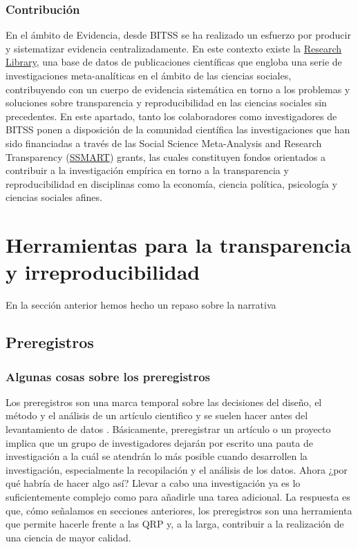 \documentclass[
]{book}
\begin{document}
\hypertarget{contribuciuxf3n}{%
\subsection{Contribución}\label{contribuciuxf3n}}

En el ámbito de Evidencia, desde BITSS se ha realizado un esfuerzo por producir y sistematizar evidencia centralizadamente. En este contexto existe la \href{https://www.bitss.org/research-library/}{Research Library}, una base de datos de publicaciones científicas que engloba una serie de investigaciones meta-analíticas en el ámbito de las ciencias sociales, contribuyendo con un cuerpo de evidencia sistemática en torno a los problemas y soluciones sobre transparencia y reproducibilidad en las ciencias sociales sin precedentes. En este apartado, tanto los colaboradores como investigadores de BITSS ponen a disposición de la comunidad científica las investigaciones que han sido financiadas a través de las Social Science Meta-Analysis and Research Transparency (\href{https://www.bitss.org/ssmart-grants/}{SSMART}) grants, las cuales constituyen fondos orientados a contribuir a la investigación empírica en torno a la transparencia y reproducibilidad en disciplinas como la economía, ciencia política, psicología y ciencias sociales afines.

\hypertarget{herramientas-para-la-transparencia-y-irreproducibilidad}{%
\chapter{Herramientas para la transparencia y irreproducibilidad}\label{herramientas-para-la-transparencia-y-irreproducibilidad}}

En la sección anterior hemos hecho un repaso sobre la narrativa

\hypertarget{preregistros}{%
\section{Preregistros}\label{preregistros}}

\hypertarget{algunas-cosas-sobre-los-preregistros}{%
\subsection{Algunas cosas sobre los preregistros}\label{algunas-cosas-sobre-los-preregistros}}

Los preregistros son una marca temporal sobre las decisiones del diseño, el método y el análisis de un artículo cientifico y se suelen hacer antes del levantamiento de datos \citep{stewart_Preregistration_2020}. Básicamente, preregistrar un artículo o un proyecto implica que un grupo de investigadores dejarán por escrito una pauta de investigación a la cuál se atendrán lo más posible cuando desarrollen la investigación, especialmente la recopilación y el análisis de los datos. Ahora ¿por qué habría de hacer algo así? Llevar a cabo una investigación ya es lo suficientemente complejo como para añadirle una tarea adicional. La respuesta es que, cómo señalamos en secciones anteriores, los preregistros son una herramienta que permite hacerle frente a las QRP y, a la larga, contribuir a la realización de una ciencia de mayor calidad.
\end{document}
